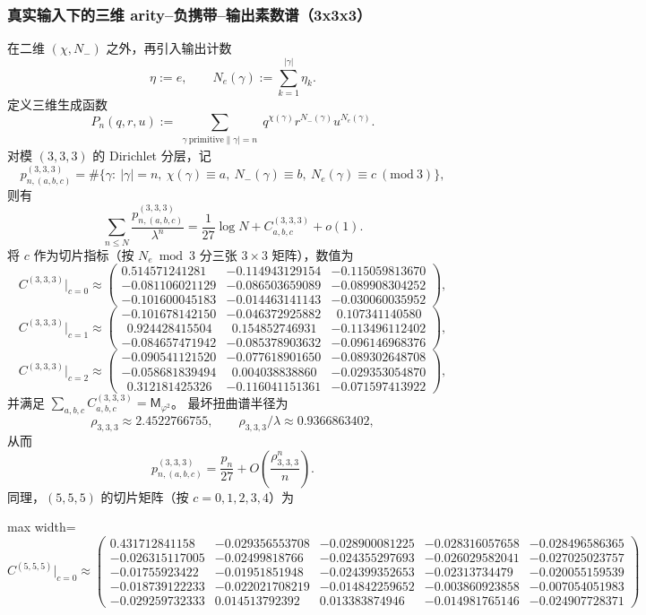 \subsubsection{真实输入下的三维 arity--负携带--输出素数谱（3x3x3）}
在二维 $(\chi,N_-)$ 之外，再引入输出计数
\[
\eta:=e,\qquad N_e(\gamma):=\sum_{k=1}^{|\gamma|}\eta_k.
\]
定义三维生成函数
\[
P_n(q,r,u):=\sum_{\substack{\gamma\ \mathrm{primitive}\|\gamma|=n}} q^{\chi(\gamma)}r^{N_-(\gamma)}u^{N_e(\gamma)}.
\]
对模 $(3,3,3)$ 的 Dirichlet 分层，记
\[
p_{n,(a,b,c)}^{(3,3,3)}
=\#\{\gamma:\ |\gamma|=n,\ \chi(\gamma)\equiv a,\ N_-(\gamma)\equiv b,\ N_e(\gamma)\equiv c\ (\mathrm{mod}\ 3)\},
\]
则有
\[
\sum_{n\le N}\frac{p_{n,(a,b,c)}^{(3,3,3)}}{\lambda^n}
=\frac{1}{27}\log N+C_{a,b,c}^{(3,3,3)}+o(1).
\]
将 $c$ 作为切片指标（按 $N_e\bmod 3$ 分三张 $3\times 3$ 矩阵），数值为
\[
C^{(3,3,3)}\big|_{c=0}\approx
\begin{pmatrix}
0.514571241281 & -0.114943129154 & -0.115059813670\\
-0.081106021129 & -0.086503659089 & -0.089908304252\\
-0.101600045183 & -0.014463141143 & -0.030060035952
\end{pmatrix},
\]
\[
C^{(3,3,3)}\big|_{c=1}\approx
\begin{pmatrix}
-0.101678142150 & -0.046372925882 & \ \ 0.107341140580\\
\ \ 0.924428415504 & \ \ 0.154852746931 & -0.113496112402\\
-0.084657471942 & -0.085378903632 & -0.096146968376
\end{pmatrix},
\]
\[
C^{(3,3,3)}\big|_{c=2}\approx
\begin{pmatrix}
-0.090541121520 & -0.077618901650 & -0.089302648708\\
-0.058681839494 & \ \ 0.004038838860 & -0.029353054870\\
\ \ 0.312181425326 & -0.116041151361 & -0.071597413922
\end{pmatrix},
\]
并满足 $\sum_{a,b,c}C_{a,b,c}^{(3,3,3)}=\mathsf{M}_{\varphi^2}$。
最坏扭曲谱半径为
\[
\rho_{3,3,3}\approx 2.4522766755,\qquad \rho_{3,3,3}/\lambda\approx 0.9366863402,
\]
从而
\[
p_{n,(a,b,c)}^{(3,3,3)}=\frac{p_n}{27}+O\!\left(\frac{\rho_{3,3,3}^n}{n}\right).
\]
同理，$(5,5,5)$ 的切片矩阵（按 $c=0,1,2,3,4$）为
\begin{center}
\begin{adjustbox}{max width=\linewidth}
\(
C^{(5,5,5)}\big|_{c=0}\approx
\begin{pmatrix}
0.431712841158 & -0.029356553708 & -0.028900081225 & -0.028316057658 & -0.028496586365\\
-0.026315117005 & -0.02499818766 & -0.024355297693 & -0.026029582041 & -0.027025023757\\
-0.01755923422 & -0.01951851948 & -0.024399352653 & -0.02313734479 & -0.020055159539\\
-0.018739122233 & -0.022021708219 & -0.014842259652 & -0.003860923858 & -0.007054051983\\
-0.029259732333 & 0.014513792392 & 0.013383874946 & -0.014981765146 & -0.024907728371
\end{pmatrix}
\)
\end{adjustbox}
\end{center}
